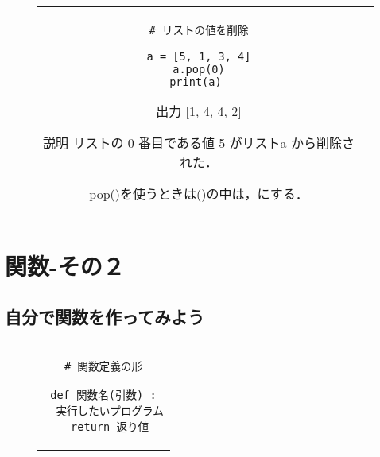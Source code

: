 \documentclass{jsarticle}
\begin{document}
\begin{figure}[h]
	\begin{tabular}{cc}
		\begin{minipage}[t]{.4\textwidth}
			\begin{lstlisting}[caption=リストの値を削除]
# リストの値を削除

a = [5, 1, 3, 4]
a.pop(0)
print(a) \end{lstlisting}
		\end{minipage} \hspace{5mm}
		\begin{minipage}[t]{.6\textwidth}
			\begin{minipage}[t]{.3\textwidth}
				\begin{itembox}[l]{出力}
					[1, 4, 4, 2]
				\end{itembox}
			\end{minipage}
			\begin{itembox}[l]{説明}
				リストの 0 番目である値 5 がリストa から削除された． \par
				pop()を使うときは()の中は，{\textgt{削除したい値の添え字}}にする． \par
			\end{itembox}
		\end{minipage}
	\end{tabular}
\end{figure}


\section{関数-その２}
\subsection{自分で関数を作ってみよう}
\begin{figure}[h]
	\begin{tabular}{c}
		\begin{minipage}[t]{.4\textwidth}
			\begin{lstlisting}[caption=関数定義の形]
# 関数定義の形

def 関数名(引数) :
  実行したいプログラム
  return 返り値
\end{lstlisting}
		\end{minipage}
	\end{tabular}
\end{figure}
\end{document}
